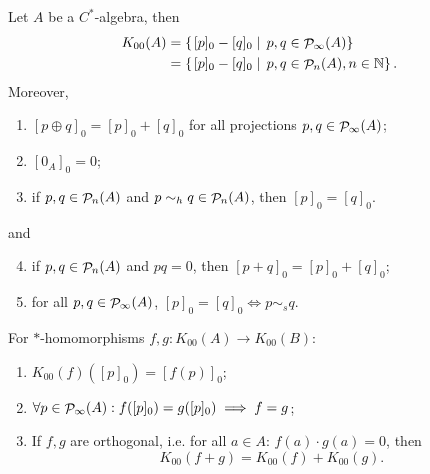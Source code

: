 \begin{proposition} \label{StandardPictureK00}
Let $A$ be a $C^*$-algebra, then
\begin{align*}
K_{00}(A) &= \left\{\left. [p]_0 - [q]_0 \;\right|\; p,q \in \mathop{\mathcal{P}}\nolimits_\infty(A) \right\} \\
&= \left\{\left. [p]_0 - [q]_0 \;\right|\; p,q \in \mathop{\mathcal{P}}\nolimits_n(A), n\in \mathbb{N} \right\}.
\end{align*}
Moreover,
\begin{enumerate}
\item $[p\oplus q]_0 = [p]_0+[q]_0$ for all projections $p,q\in\mathop{\mathcal{P}}\nolimits_\infty(A)$;
\item $[0_A]_0 = 0$;
\item if $p,q\in\mathop{\mathcal{P}}\nolimits_n(A)$ and $p\sim_h q \in \mathop{\mathcal{P}}\nolimits_n(A)$, then $[p]_0 = [q]_0$.
\end{enumerate}
and
\begin{enumerate}
\setcounter{enumi}{3}
\item if $p,q\in\mathop{\mathcal{P}}\nolimits_n(A)$ and $pq =0$, then $[p+q]_0 = [p]_0+[q]_0$;
\item for all $p,q\in\mathop{\mathcal{P}}\nolimits_\infty(A)$, $[p]_0 = [q]_0 \iff p\sim_s q$.
\end{enumerate}
For $*$-homomorphisms $f,g: K_{00}(A)\to K_{00}(B)$:
\begin{enumerate}
\item $K_{00}(f)([p]_0) = [f(p)]_0$;
\item $\forall p\in\mathop{\mathcal{P}}\nolimits_\infty(A): f([p]_0) = g([p]_0) \implies  f = g$;
\item If $f,g$ are orthogonal, i.e. for all $a\in A$: $f(a)\cdot g(a) = 0$, then
\[ K_{00}(f+g) = K_{00}(f)+K_{00}(g). \]
\end{enumerate}
\end{proposition}
